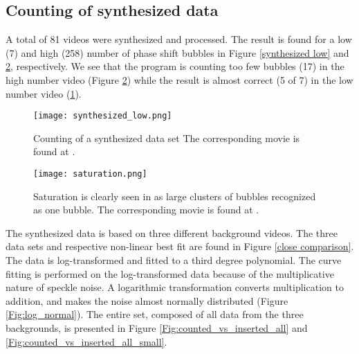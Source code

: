 \clearpage
\subsection{Counting of synthesized data}
A total of 81 videos were synthesized and processed. The result is found for a low (7) and high (258) number of phase shift bubbles in Figure \ref{synthesized low} and \ref{Fig:saturation}, respectively. We see that the program is counting too few bubbles (17) in the high number video (Figure \ref{Fig:saturation}) while the result is almost correct (5 of 7) in the low number video (\ref{Fig:synthesized low}).

\begin{figure}[h]
	\centering
	\texttt{[image: synthesized\_low.png]}
	\cprotect\caption{Counting of a synthesized data set The corresponding movie is found at  .}
	\label{Fig:synthesized low}
\end{figure}

\begin{figure}[h]
	\centering
	\texttt{[image: saturation.png]}
	\cprotect\caption{Saturation is clearly seen in as large clusters of bubbles recognized as one bubble. The corresponding movie is found at  .}
	\label{Fig:saturation}
\end{figure}

The synthesized data is based on three different background videos. The three data sets and respective non-linear best fit are found in Figure \ref{close comparison}. The data is log-transformed and fitted to a third degree polynomial. The curve fitting is performed on the log-transformed data because of the multiplicative nature of speckle noise. A logarithmic transformation converts multiplication to addition, and makes the noise almost normally distributed (Figure \ref{Fig:log_normal}). The entire set, composed of all data from the three backgrounds, is presented in Figure \ref{Fig:counted_vs_inserted_all} and \ref{Fig:counted_vs_inserted_all_small}.

